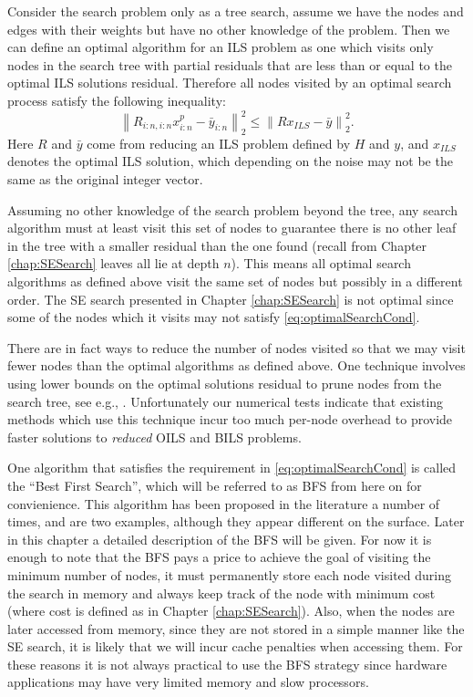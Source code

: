 \documentclass[12pt,Bold,letterpaper]{mcgilletdclass}
\begin{document}
Consider the search problem only as a tree search, assume we have the nodes and edges with their weights but have no other knowledge of the problem. Then we can define an optimal algorithm for an ILS problem as one which visits only nodes in the search tree with partial residuals that are less than or equal to the optimal ILS solutions residual. Therefore all nodes visited by an optimal search process satisfy the following inequality:
\begin{equation}\label{eq:optimalSearchCond}
\left \| R_{i:n,i:n}x_{i:n}^p - \bar{y}_{i:n}\right \|_2^2 \le \left \| Rx_{ILS} - \bar{y} \right \|_2^2.
\end{equation}
Here  $R$ and $\bar{y}$ come from reducing an ILS problem defined by $H$ and $y$, and $x_{ILS}$ denotes the optimal ILS solution, which depending on the noise may not be the same as the original integer vector. 

Assuming no other knowledge of the search problem beyond the tree, any search algorithm must at least visit this set of nodes to guarantee there is no other leaf in the tree with a smaller residual than the one found (recall from Chapter \ref{chap:SESearch} leaves all lie at depth $n$). This means all optimal search algorithms as defined above visit the same set of nodes but possibly in a different order. The SE search presented in Chapter \ref{chap:SESearch} is not optimal since some of the nodes which it visits may not satisfy \eqref{eq:optimalSearchCond}. 

There are in fact ways to reduce the number of nodes visited so that we may visit fewer nodes than the optimal algorithms as defined above. One technique involves using lower bounds on the optimal solutions residual to prune nodes from the search tree, see e.g., \cite{StoVH08}. Unfortunately our numerical tests indicate that existing methods which use this technique incur too much per-node overhead to provide faster solutions to {\em reduced} OILS and BILS problems.

One algorithm that satisfies the requirement in \eqref{eq:optimalSearchCond} is called the ``Best First Search'', which will be referred to as BFS from here on for convienience. This algorithm has been proposed in the literature a number of times, \cite{FukMU04} and \cite{XuWZW04} are two examples, although they appear different on the surface. Later in this chapter a detailed description of the BFS will be given. For now it is enough to note that the BFS pays a price to achieve the goal of visiting the minimum number of nodes, it must permanently store each node visited during the search in memory and always keep track of the node with minimum cost (where cost is defined as in Chapter \ref{chap:SESearch}). Also, when the nodes are later accessed from memory, since they are not stored in a simple manner like the SE search, it is likely that we will incur cache penalties when accessing them. For these reasons it is not always practical to use the BFS strategy since hardware applications may have very limited memory and slow processors.
\end{document}
